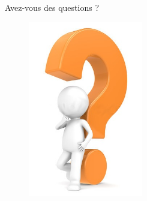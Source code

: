 \documentclass{beamer}
\begin{document}
%

	

	\begin{frame}{Avez-vous des questions ?}
		\begin{figure}[H]
			\centering
			\includegraphics[width=5cm]{images/interrogation.jpg}
		\end{figure}
	\end{frame}
\end{document}
